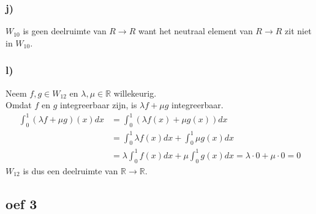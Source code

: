 \documentclass[lineaire_algebra_oplossingen.tex]{subfiles}
\begin{document}
\subsubsection*{j)}
$W_{10}$ is geen deelruimte van $R\rightarrow R$ want het neutraal element van $R\rightarrow R$  zit niet in $W_{10}$.
\subsubsection*{l)}
Neem $f, g \in W_{12}$ en $\lambda, \mu \in \mathbb{R}$ willekeurig.\\
Omdat $f$ en $g$ integreerbaar zijn, is $\lambda f + \mu g$ integreerbaar.
\begin{align*}
  \int^1_0 (\lambda f + \mu g)(x)dx &= \int^1_0(\lambda f(x) + \mu g(x))dx\\
  &= \int^1_0 \lambda f(x)dx + \int^1_0 \mu g(x)dx\\
  &= \lambda \int^1_0 f(x)dx + \mu \int^1_0 g(x)dx = \lambda \cdot 0 + \mu \cdot 0 = 0
\end{align*}
$W_{12}$ is dus een deelruimte van $\mathbb{R} \rightarrow \mathbb{R}$.



\subsection*{oef 3}
\end{document}
